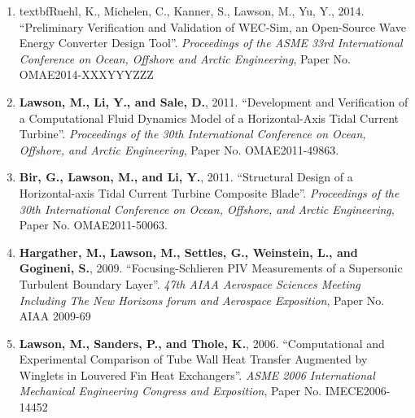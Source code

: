 \begin{enumerate}[leftmargin=1.5pc,itemsep=0pt,parsep=0pt,topsep=0pt,partopsep=1pt]
\item textbf{Ruehl, K., Michelen, C., Kanner, S., Lawson, M., Yu, Y.}, 2014. ``Preliminary Verification and Validation of WEC-Sim, an Open-Source Wave Energy Converter Design Tool''. \emph{Proceedings of the ASME 33rd International Conference on Ocean, Offshore and Arctic Engineering}, Paper No. OMAE2014-XXXYYYZZZ

\item \textbf{Lawson, M., Li, Y., and Sale, D.}, 2011. ``Development and Verification of a Computational Fluid Dynamics Model of a Horizontal-Axis Tidal Current Turbine''. \emph{Proceedings of the 30th International Conference on Ocean, Offshore, and Arctic Engineering}, Paper No. OMAE2011-49863.

\item \textbf{Bir, G., Lawson, M., and Li, Y.}, 2011. ``Structural Design of a Horizontal-axis Tidal Current Turbine Composite Blade''. \emph{Proceedings of the 30th International Conference on Ocean, Offshore, and Arctic Engineering}, Paper No. OMAE2011-50063.

\item \textbf{Hargather, M., Lawson, M., Settles, G., Weinstein, L., and Gogineni, S.}, 2009. ``Focusing-Schlieren PIV Measurements of a Supersonic Turbulent Boundary Layer''. \emph{47th AIAA Aerospace Sciences Meeting Including The New Horizons forum and Aerospace Exposition}, Paper No. AIAA 2009-69

\item \textbf{Lawson, M., Sanders, P., and Thole, K.}, 2006. ``Computational and Experimental Comparison of Tube Wall Heat Transfer Augmented by Winglets in Louvered Fin Heat Exchangers''. \emph{ASME 2006 International Mechanical Engineering Congress and Exposition}, Paper No. IMECE2006-14452

\end{enumerate}




